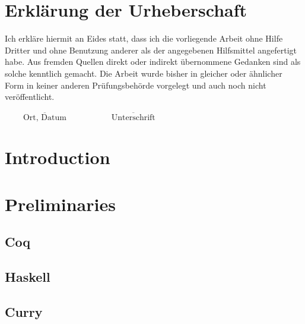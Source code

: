 \documentclass[a4paper, 11pt, fleqn, twoside]{scrreprt}
\begin{document}
\chapter*{Erklärung der Urheberschaft}
\vspace{2cm}
Ich erkläre hiermit an Eides statt, dass ich die vorliegende Arbeit
ohne Hilfe Dritter und ohne Benutzung anderer als der angegebenen
Hilfsmittel angefertigt habe. Aus fremden Quellen direkt oder
indirekt übernommene Gedanken sind als solche kenntlich gemacht. Die
Arbeit wurde bisher in gleicher oder ähnlicher Form in keiner anderen
Prüfungsbehörde vorgelegt und auch noch nicht veröffentlicht.

\vspace{4cm}
\hspace{1cm} $\overline{~~~~~~~~~~\mbox{Ort, Datum}~~~~~~~~~~}$ \hfill $\overline{~~~~~~~~~~~~~\mbox{Unterschrift}~~~~~~~~~~~~~}$ \hspace{1cm}

\newpage
\mbox{}
\thispagestyle{empty}
\newpage

\renewcommand{\contentsname}{Contents}
\tableofcontents   %

\newpage               %


\chapter{Introduction}

\chapter{Preliminaries}

\section{Coq}

\section{Haskell}

\section{Curry}
\end{document}
